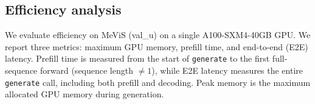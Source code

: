 \begin{table}[t]
\caption{Ablation study of Sa2VA-Select under a fixed 30\% visual token budget.
We compare the Sa2VA-1B baseline, a selector with LIS+DiffTopK but without CAS, and several CAS schedules with different $\lambda_t$ ranges.
We report cIoU for image referring segmentation, J\&F for video referring segmentation, and relative average performance with respect to the Sa2VA-1B baseline (100\%).}
\label{tab:ablation_budget30}
\centering
\scriptsize
\setlength{\tabcolsep}{3.0pt}
\end{table}

\subsection{Efficiency analysis}
We evaluate efficiency on MeViS (val\_u) on a single A100-SXM4-40GB GPU.
We report three metrics: maximum GPU memory, prefill time, and end-to-end (E2E) latency.
Prefill time is measured from the start of \texttt{generate} to the first full-sequence forward (sequence length $\neq 1$), while E2E latency measures the entire \texttt{generate} call, including both prefill and decoding.
Peak memory is the maximum allocated GPU memory during generation.

